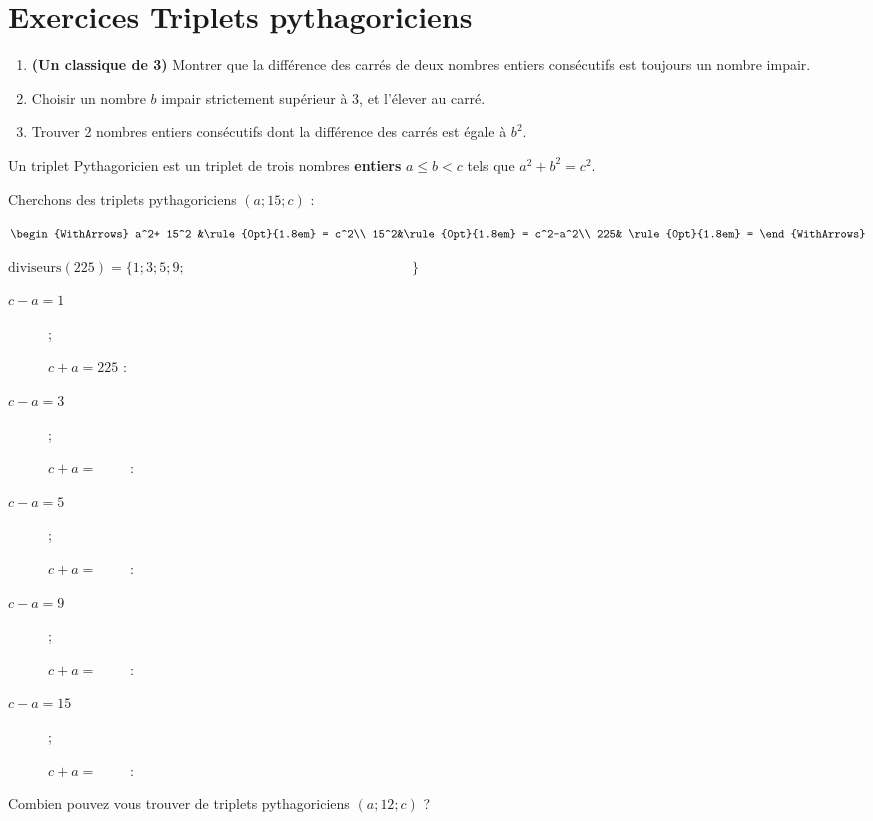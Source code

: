 \section{Exercices Triplets pythagoriciens} 
\begin{exercise}\hfill 
	\begin{enumerate}[label=\alph*), leftmargin=*]
		\item \textbf{(Un classique de 3\ieme)}	Montrer que la différence des carrés de deux nombres entiers consécutifs est toujours un nombre impair.
		\item Choisir un nombre $b$ impair strictement supérieur à 3, et l'élever au carré.
		\item Trouver 2 nombres entiers consécutifs dont la différence des carrés est égale à $b^2$. 
	\end{enumerate}
\end{exercise}
\begin{tBox}
	Un triplet Pythagoricien est un triplet de trois nombres \textbf{entiers} $a\leqslant  b<c$ tels que $a^2+b^2=c^2$. 
\end{tBox} 
 \begin{example} Cherchons des triplets pythagoriciens $(a; 15; c)$ :
 	
 	\noindent \parbox[t]{0.3\linewidth}{
 		$\begin{WithArrows}
 			a^2+ 15^2 &\rule{0pt}{1.8em} = c^2\\
 			15^2&\rule{0pt}{1.8em} = c^2-a^2\\
 			225& \rule{0pt}{1.8em} =
 		\end{WithArrows}$  
 	}
 	\parbox[t]{0.65\linewidth}{
 		$\operatorname{diviseurs(225)}=\{
 		1; 3; 5; 9; \phantom{15; \qquad 25; \qquad 45 ; \qquad ;75; \qquad ; 225 } \}$  
 		\begin{description}
 			\item[$c-a=1$];\rule{0pt}{1.8em} $c+a=225$ :
 			\item[$c-a=3$];\rule{0pt}{1.8em} $c+a=\qquad$ :
 			\item[$c-a=5$];\rule{0pt}{1.8em} $c+a=\qquad$ :
 			\item[$c-a=9$];\rule{0pt}{1.8em} $c+a=\qquad$ :
 			\item[$c-a=15$];\rule{0pt}{1.8em} $c+a=\qquad$ : 
 		\end{description}
 	}
 \end{example} 
\begin{exercise}[À vous]\label{chapitre05:exercice:tripletspythagoriciens}   Combien pouvez vous trouver de triplets pythagoriciens $(a; 12; c)$ ?
\end{exercise} 

